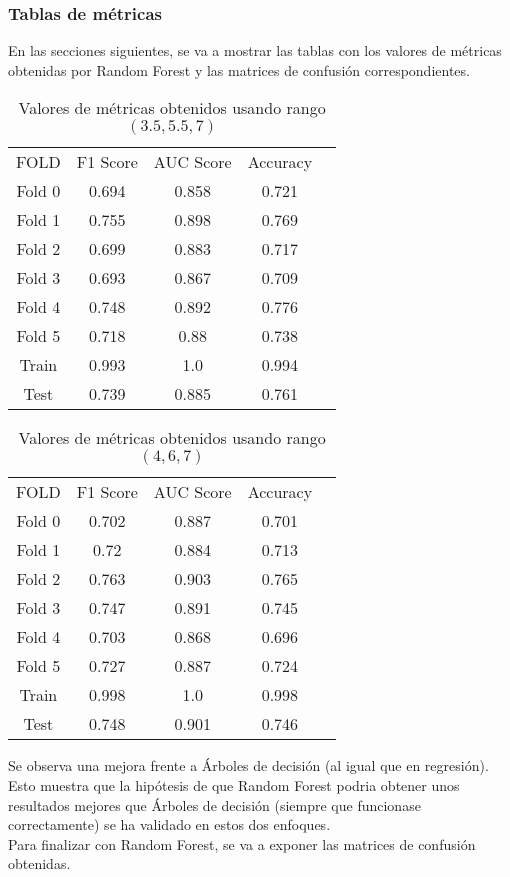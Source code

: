 \subsubsection*{Tablas de métricas}
En las secciones siguientes, se va a mostrar las tablas con los valores de métricas obtenidas por Random Forest y las matrices de confusión correspondientes.
\begin{table}[H]
	\centering
	\begin{tabular}{|c|c|c|c|c}
		\cline{1-4}
		FOLD   & F1 Score & AUC Score & Accuracy \\ \cline{1-4}
		Fold 0 & 0.694    & 0.858     & 0.721    \\ \cline{1-4}
		Fold 1 & 0.755    & 0.898     & 0.769    \\ \cline{1-4}
		Fold 2 & 0.699    & 0.883     & 0.717    \\ \cline{1-4}
		Fold 3 & 0.693    & 0.867     & 0.709    \\ \cline{1-4}
		Fold 4 & 0.748    & 0.892     & 0.776    \\ \cline{1-4}
		Fold 5 & 0.718    & 0.88      & 0.738    \\ \cline{1-4}
		Train  & 0.993    & 1.0       & 0.994    \\ \cline{1-4}
		Test   & 0.739    & 0.885     & 0.761    \\ \cline{1-4}
	\end{tabular}
	\caption{Valores de métricas obtenidos usando rango $(3.5,5.5,7)$}
\end{table}
\begin{table}[H]
	\centering
	\begin{tabular}{|c|c|c|c|c}
		\cline{1-4}
		FOLD   & F1 Score & AUC Score & Accuracy \\ \cline{1-4}
		Fold 0 & 0.702    & 0.887     & 0.701    \\  \cline{1-4}
		Fold 1 & 0.72     & 0.884     & 0.713    \\  \cline{1-4}
		Fold 2 & 0.763    & 0.903     & 0.765    \\  \cline{1-4}
		Fold 3 & 0.747    & 0.891     & 0.745    \\  \cline{1-4}
		Fold 4 & 0.703    & 0.868     & 0.696    \\  \cline{1-4}
		Fold 5 & 0.727    & 0.887     & 0.724    \\  \cline{1-4}
		Train  & 0.998    & 1.0       & 0.998    \\ \cline{1-4}
		Test   & 0.748    & 0.901     & 0.746    \\ \cline{1-4}
	\end{tabular}
	\caption{Valores de métricas obtenidos usando rango $(4,6,7)$}
\end{table}
Se observa una mejora frente a Árboles de decisión (al igual que en regresión). Esto muestra que la hipótesis de que Random Forest podria obtener unos resultados mejores que Árboles de decisión (siempre que funcionase correctamente) se ha validado en estos dos enfoques.\\
\clearpage
Para finalizar con Random Forest, se va a exponer las matrices de confusión obtenidas.
